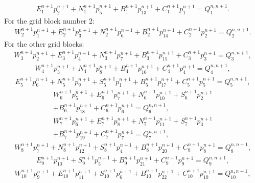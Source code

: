 %
\begin{multline}
	\label{equation-example-evaluation-grid-block-2}
	E^{n+1}_{1}p^{n+1}_{2}+N^{n+1}_{1}p^{n+1}_{5}+B^{n+1}_{1}p^{n+1}_{13}+C^{n+1}_{1}p^{n+1}_{1}=Q^{n, n+1}_{1}.
\end{multline}
%
For the grid block number 2:
%
\begin{multline}
	\label{equation-example-evaluation-grid-block-3}
	W^{n+1}_{2}p^{n+1}_{1}+E^{n+1}_{2}p^{n+1}_{3}+N^{n+1}_{2}p^{n+1}_{6}+B^{n+1}_{2}p^{n+1}_{14}+C^{n+1}_{2}p^{n+1}_{2}=Q^{n, n+1}_{2}.
\end{multline}
%
For the other grid blocks:
%
\begin{multline}
	W^{n+1}_{3}p^{n+1}_{2}+E^{n+1}_{3}p^{n+1}_{4}+N^{n+1}_{3}p^{n+1}_{7}+B^{n+1}_{3}p^{n+1}_{15}+C^{n+1}_{3}p^{n+1}_{3}=Q^{n, n+1}_{3},
\end{multline}
%
\begin{multline}
	W^{n+1}_{4}p^{n+1}_{3}+N^{n+1}_{4}p^{n+1}_{8}+B^{n+1}_{4}p^{n+1}_{16}+C^{n+1}_{4}p^{n+1}_{4}=Q^{n, n+1}_{4},
\end{multline}
%
\begin{multline}
	E^{n+1}_{5}p^{n+1}_{6}+N^{n+1}_{5}p^{n+1}_{9}+S^{n+1}_{5}p^{n+1}_{1}+B^{n+1}_{5}p^{n+1}_{17}+C^{n+1}_{5}p^{n+1}_{5}=Q^{n, n+1}_{5},
\end{multline}
%
\begin{multline}
	W^{n+1}_{6}p^{n+1}_{5}+E^{n+1}_{6}p^{n+1}_{7}+N^{n+1}_{6}p^{n+1}_{10}+S^{n+1}_{6}p^{n+1}_{2}\\+B^{n+1}_{6}p^{n+1}_{18}+C^{n+1}_{6}p^{n+1}_{6}=Q^{n, n+1}_{6},
\end{multline}
%
\begin{multline}
	W^{n+1}_{7}p^{n+1}_{6}+E^{n+1}_{7}p^{n+1}_{8}+N^{n+1}_{7}p^{n+1}_{11}+S^{n+1}_{7}p^{n+1}_{3}\\+B^{n+1}_{7}p^{n+1}_{19}+C^{n+1}_{7}p^{n+1}_{7}=Q^{n, n+1}_{7},
\end{multline}
%
\begin{multline}
	W^{n+1}_{8}p^{n+1}_{7}+N^{n+1}_{8}p^{n+1}_{12}+S^{n+1}_{8}p^{n+1}_{4}+B^{n+1}_{8}p^{n+1}_{20}+C^{n+1}_{8}p^{n+1}_{8}=Q^{n, n+1}_{8},
\end{multline}
%
\begin{multline}
	E^{n+1}_{9}p^{n+1}_{10}+S^{n+1}_{9}p^{n+1}_{5}+B^{n+1}_{9}p^{n+1}_{21}+C^{n+1}_{9}p^{n+1}_{9}=Q^{n, n+1}_{9},
\end{multline}
%
\begin{multline}
	W^{n+1}_{10}p^{n+1}_{9}+E^{n+1}_{10}p^{n+1}_{11}+S^{n+1}_{10}p^{n+1}_{6}+B^{n+1}_{10}p^{n+1}_{22}+C^{n+1}_{10}p^{n+1}_{10}=Q^{n, n+1}_{10},
\end{multline}

